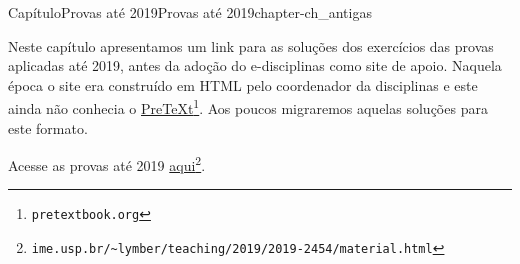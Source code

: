 \documentclass[oneside,10pt,]{book}
\numberwithin{equation}{section}
\providecommand\phantomsection{}
\begin{document}
\begin{chapterptx}{Capítulo}{Provas até 2019}{}{Provas até 2019}{}{}{chapter-ch_antigas}
\renewcommand*{\chaptername}{Capítulo}
\begin{introduction}{}%
Neste capítulo apresentamos um link para as soluções dos exercícios das provas aplicadas até 2019, antes da adoção do e-disciplinas como site de apoio. Naquela época o site era construído em HTML pelo coordenador da disciplinas e este ainda não conhecia o \href{https://pretextbook.org}{PreTeXt}\footnote{\nolinkurl{pretextbook.org}\label{fn-ch_antigas-b-a-b}}. Aos poucos migraremos aquelas soluções para este formato.%
\par
Acesse as provas até 2019 \href{https://www.ime.usp.br/\~lymber/teaching/2019/2019-2454/material.html}{aqui}\footnote{\nolinkurl{ime.usp.br/\~lymber/teaching/2019/2019-2454/material.html}\label{fn-ch_antigas-b-b-b}}.%
\end{introduction}%
\end{chapterptx}
%
\appendix%
%
\clearpage\phantomsection%
%
%
%
\typeout{************************************************}
\typeout{************************************************}
%
\end{document}
